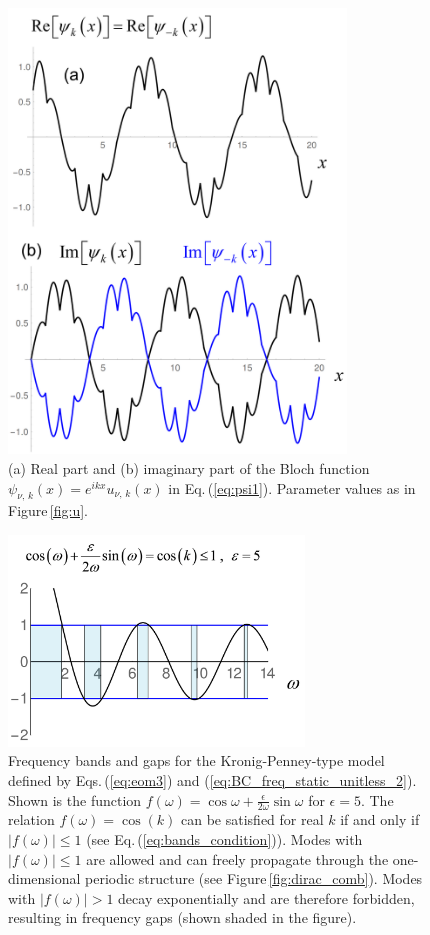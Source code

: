 \begin{figure}
    \includegraphics[width=0.8\textwidth, keepaspectratio]{figures/system/psi.png}
    \caption{(a) Real part and (b) imaginary part of the Bloch function 
    $\psi_{\nu,\,k}(x) = e^{i k x} u_{\nu,\,k}(x)$ in Eq.\,(\ref{eq:psi1}). 
    Parameter values as in Figure\,\ref{fig:u}.}  
    \label{fig:psi}
\end{figure}
%
\begin{figure}
    \includegraphics[width=0.7\textwidth, keepaspectratio]{figures/system/cosk.png}
    \caption{Frequency bands and gaps for the Kronig-Penney-type model defined by 
    Eqs.\,(\ref{eq:eom3}) and (\ref{eq:BC_freq_static_unitless_2}).
    Shown is the function
    $f(\omega) = \cos{\omega} + \frac{\epsilon}{2 \omega} \sin{\omega}$ for $\epsilon=5$. 
    The relation $f(\omega) = \cos(k)$ can be satisfied for real $k$ if and only if 
    $|f(\omega)| \le 1$ (see Eq.\,(\ref{eq:bands_condition})). 
    Modes with $|f(\omega)| \le 1$
    are allowed and can freely propagate through the one-dimensional periodic structure
    (see Figure\,\ref{fig:dirac_comb}).
    Modes with $|f(\omega)| > 1$ decay exponentially and are therefore forbidden, 
    resulting in frequency gaps (shown shaded in the figure).}
    \label{fig:band_condition}
\end{figure}
